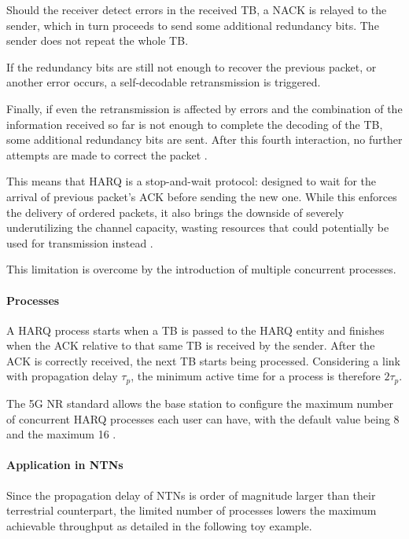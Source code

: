 Should the receiver detect errors in the received \ac{TB}, a \ac{NACK} is relayed to the sender, which in turn proceeds to send some additional redundancy bits. The sender does not repeat the whole \ac{TB}.

If the redundancy bits are still not enough to recover the previous packet, or another error occurs, a self-decodable retransmission is triggered. 

Finally, if even the retransmission is affected by errors and the combination of the information received so far is not enough to complete the decoding of the \ac{TB}, some additional redundancy bits are sent. After this fourth interaction, no further attempts are made to correct the packet \cite{5g-nr-harq-sharetechnote}.

This means that \ac{HARQ} is a stop-and-wait protocol: designed to wait for the arrival of previous packet's \ac{ACK} before sending the new one. While this enforces the delivery of ordered packets, it also brings the downside of severely underutilizing the channel capacity, wasting resources that could potentially be used for transmission instead \cite{3gpp-ts-38.214}.

This limitation is overcome by the introduction of multiple concurrent processes.

\paragraph{Processes}
A \ac{HARQ} process starts when a \ac{TB} is passed to the \ac{HARQ} entity and finishes when the \ac{ACK} relative to that same \ac{TB} is received by the sender. After the \ac{ACK} is correctly received, the next \ac{TB} starts being processed. Considering a link with propagation delay $\tau_p$, the minimum active time for a process is therefore $2\tau_p$. 

The 5G \ac{NR} standard allows the base station to configure the maximum number of concurrent \ac{HARQ} processes each user can have, with the default value being 8 and the maximum 16 \cite{3gpp-ts-38.300, 5g-nr-harq-devopedia}. 

\paragraph{Application in \ac{NTNs}}
Since the propagation delay of \ac{NTNs} is order of magnitude larger than their terrestrial counterpart, the limited number of processes lowers the maximum achievable throughput as detailed in the following toy example. 

